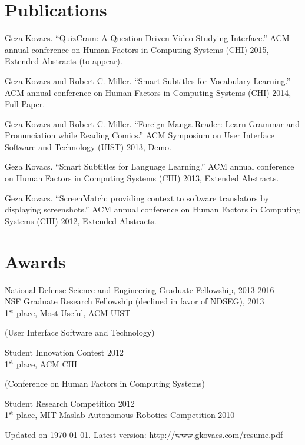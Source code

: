\documentclass[margin,line]{resume}
\begin{document}
\begin{resume}
\section{\mysidestyle Publications}

Geza Kovacs. ``QuizCram: A Question-Driven Video Studying Interface.'' ACM annual conference on Human Factors in Computing Systems (CHI) 2015, Extended Abstracts (to appear).

Geza Kovacs and Robert C. Miller. ``Smart Subtitles for Vocabulary Learning.'' ACM annual conference on Human Factors in Computing Systems (CHI) 2014, Full Paper.

Geza Kovacs and Robert C. Miller. ``Foreign Manga Reader: Learn Grammar and Pronunciation while Reading Comics.'' ACM Symposium on User Interface Software and Technology (UIST) 2013, Demo.

Geza Kovacs. ``Smart Subtitles for Language Learning.'' ACM annual conference on Human Factors in Computing Systems (CHI) 2013, Extended Abstracts.%

Geza Kovacs. ``ScreenMatch: providing context to software translators by displaying screenshots.'' ACM annual conference on Human Factors in Computing Systems (CHI) 2012, Extended Abstracts.%

\section{\mysidestyle Awards}

National Defense Science and Engineering Graduate Fellowship, 2013-2016\\
NSF Graduate Research Fellowship (declined in favor of NDSEG), 2013 \\
1$^{\textrm{st}}$ place, Most Useful, ACM UIST \begin{small}(User Interface Software and Technology)\end{small} Student Innovation Contest 2012\\
1$^{\textrm{st}}$ place, ACM CHI \begin{small}(Conference on Human Factors in Computing Systems)\end{small} Student Research Competition 2012\\
1$^{\textrm{st}}$ place, MIT Maslab Autonomous Robotics Competition 2010

\vspace{-3mm}

\begin{small}
\begin{center}
Updated on \today. Latest version: \href{http://www.gkovacs.com/resume.pdf}{http://www.gkovacs.com/resume.pdf}
\end{center}
\end{small}

\end{resume}
\end{document}
